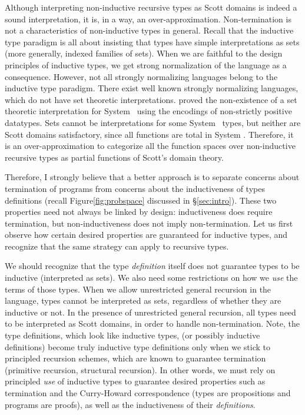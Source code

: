 Although interpreting non-inductive recursive types as Scott domains
is indeed a sound interpretation, it is, in a way, an over-approximation.
Non-termination is not a characteristics of non-inductive types in general.
Recall that the inductive type paradigm is all about insisting that types have
simple interpretations as sets (more generally, indexed families of sets).
When we are faithful to the design principles of inductive types,
we get strong normalization of the language as a consequence. However,
not all strongly normalizing languages belong to the inductive type paradigm.
There exist well known strongly normalizing languages, which do not have
set theoretic interpretations. \citet{ReyPlo93} proved
the non-existence of a set theoretic interpretation for System \F\ using
the encodings of non-strictly positive datatypes. Sets cannot be interpretations
for some System \F\ types, but neither are Scott domains satisfactory, since
all functions are total in System \F. Therefore, it is an over-approximation
to categorize all the function spaces over non-inductive recursive types as
partial functions of Scott's domain theory.

Therefore, I strongly believe that a better approach is to separate concerns
about termination of programs from concerns about the inductiveness of types
definitions (recall Figure\;\ref{fig:probspace} discussed in
\S\ref{sec:intro}). These two properties need not always be linked
by design: inductiveness does require termination, but non-inductiveness
does not imply non-termination. Let us first observe how certain desired
properties are guaranteed for inductive types, and recognize that the same
strategy can apply to recursive types.

We should recognize that the type \emph{definition} itself does not guarantee
types to be inductive (\ie interpreted as sets). We also need some restrictions
on how we \emph{use} the terms of those types.  When we allow unrestricted
general recursion in the language, types cannot be interpreted as sets,
regardless of whether they are inductive or not. In the presence of unrestricted
general recursion, all types need to be interpreted as Scott domains,
in order to handle non-termination. Note, the type definitions,
which look like inductive types, (or possibly inductive definitions)
become truly inductive type definitions only when we stick to
principled recursion schemes, which are known to guarantee termination
(\eg primitive recursion, structural recursion). In other words, we must rely on
principled \emph{use} of inductive types to guarantee desired properties such as
termination and the Curry-Howard correspondence (\ie types are propositions and
programs are proofs), as well as the inductiveness of their \emph{definitions}.

